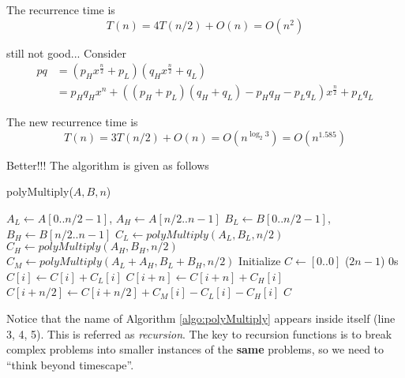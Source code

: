                     The recurrence time is
                    \begin{equation*}
                        T(n) = 4T(n/2) + O(n) = O(n^2)
                    \end{equation*}

                    still not good... Consider
                    \begin{align*}
                        pq &= (p_H x^{\frac{n}{2}} + p_L)(q_H x^{\frac{n}{2}} + q_L) \\
                           &= p_Hq_Hx^n + ((p_H + p_L)(q_H + q_L) - p_Hq_H - p_Lq_L)x^{\frac{n}{2}} + p_Lq_L
                    \end{align*}

                    The new recurrence time is
                    \begin{equation*}
                        T(n) = 3T(n/2) + O(n) = O(n^{\log_2 3}) = O(n^{1.585})
                    \end{equation*}

                    Better!!! The algorithm is given as follows

                    \begin{algorithm}[H]
                        \caption{polyMultiply($A, B, n$)}
                        \label{algo:polyMultiply}
                        \begin{algorithmic}[1]
                            \State $A_L \gets A[0 .. n/2-1]$, $A_H \gets A[n/2 .. n-1]$
                            \State $B_L \gets B[0 .. n/2-1]$, $B_H \gets B[n/2 .. n-1]$
                            \State $C_L \gets polyMultiply(A_L, B_L, n/2)$
                            \State $C_H \gets polyMultiply(A_H, B_H, n/2)$
                            \State $C_M \gets polyMultiply(A_L + A_H, B_L + B_H, n/2)$
                            \State Initialize $C \gets [0 .. 0]$ ($2n - 1$) 0s
                                \State $C[i] \gets C[i] + C_L[i]$
                                \State $C[i + n] \gets C[i + n] + C_H[i]$
                                \State $C[i + n/2] \gets C[i + n/2] + C_M[i] - C_L[i] - C_H[i]$
                            \EndFor
                            \State \Return $C$
                        \end{algorithmic}
                    \end{algorithm}

                    Notice that the name of Algorithm \ref{algo:polyMultiply} appears inside itself (line 3, 4, 5). This is referred as \textit{recursion}. The key to recursion functions is to break complex problems into smaller instances of the \textbf{same} problems, so we need to ``think beyond timescape''.

